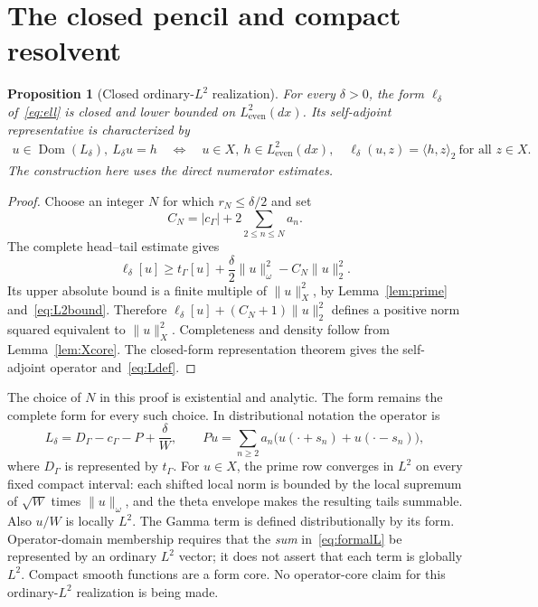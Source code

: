 \documentclass[11pt,a4paper]{article}
\numberwithin{equation}{section}
\newtheorem{proposition}[theorem]{Proposition}
\theoremstyle{remark}
\newcommand{\Le}{L^2_{\mathrm{even}}(dx)}
\newcommand{\tg}{t_{\Gamma}}
\newcommand{\cg}{c_{\Gamma}}
\newcommand{\dom}{\operatorname{Dom}}
\newcommand{\ip}[2]{\langle #1,#2\rangle}
\newcommand{\norm}[1]{\lVert #1\rVert}
\begin{document}
\section{The closed pencil and compact resolvent}\label{sec:pencil}

\begin{proposition}[Closed ordinary-$L^2$ realization]\label{prop:closedpencil}
For every $\delta>0$, the form $\ell_\delta$ of~\eqref{eq:ell} is closed and lower bounded on $\Le$. Its self-adjoint representative is characterized by
\begin{equation}\label{eq:Ldef}
 \begin{split}
 u\in\dom(L_\delta),\ L_\delta u=h\quad\Longleftrightarrow\quad
 u\in X,\ h\in\Le,\quad
 \ell_\delta(u,z)=\ip{h}{z}_2\ \text{for all }z\in X.
 \end{split}
\end{equation}
The construction here uses the direct numerator estimates.
\end{proposition}
\begin{proof}
Choose an integer $N$ for which $r_N\le\delta/2$ and set
\[
 C_N=|\cg|+2\sum_{2\le n\le N}a_n.
\]
The complete head--tail estimate gives
\begin{equation}\label{eq:coercive}
 \ell_\delta[u]\ge\tg[u]+\frac\delta2\norm{u}_\omega^2-C_N\norm{u}_2^2.
\end{equation}
Its upper absolute bound is a finite multiple of $\norm{u}_X^2$, by Lemma~\ref{lem:prime} and~\eqref{eq:L2bound}. Therefore
$\ell_\delta[u]+(C_N+1)\norm{u}_2^2$ defines a positive norm squared equivalent to $\norm{u}_X^2$. Completeness and density follow from Lemma~\ref{lem:Xcore}. The closed-form representation theorem gives the self-adjoint operator and~\eqref{eq:Ldef}.
\end{proof}

The choice of $N$ in this proof is existential and analytic. The form remains the complete form for every such choice. In distributional notation the operator is
\begin{equation}\label{eq:formalL}
 L_\delta=D_\Gamma-\cg-P+\frac\delta W,
 \qquad
 Pu=\sum_{n\ge2}a_n\bigl(u(\cdot+s_n)+u(\cdot-s_n)\bigr),
\end{equation}
where $D_\Gamma$ is represented by $\tg$. For $u\in X$, the prime row converges in $L^2$ on every fixed compact interval: each shifted local norm is bounded by the local supremum of $\sqrt W$ times $\norm{u}_\omega$, and the theta envelope makes the resulting tails summable. Also $u/W$ is locally $L^2$. The Gamma term is defined distributionally by its form. Operator-domain membership requires that the \emph{sum} in~\eqref{eq:formalL} be represented by an ordinary $L^2$ vector; it does not assert that each term is globally $L^2$. Compact smooth functions are a form core. No operator-core claim for this ordinary-$L^2$ realization is being made.
\end{document}
